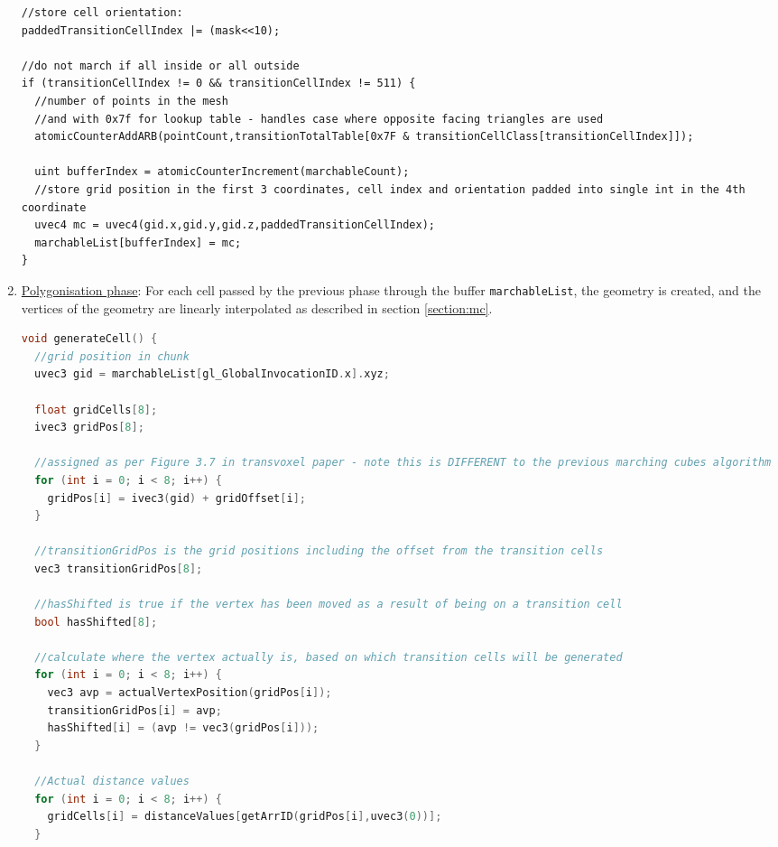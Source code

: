 \documentclass[11pt]{article}
\begin{document}
\begin{enumerate}
\begin{lstlisting}
//store cell orientation:
paddedTransitionCellIndex |= (mask<<10);

//do not march if all inside or all outside
if (transitionCellIndex != 0 && transitionCellIndex != 511) {
  //number of points in the mesh
  //and with 0x7f for lookup table - handles case where opposite facing triangles are used
  atomicCounterAddARB(pointCount,transitionTotalTable[0x7F & transitionCellClass[transitionCellIndex]]);

  uint bufferIndex = atomicCounterIncrement(marchableCount);
  //store grid position in the first 3 coordinates, cell index and orientation padded into single int in the 4th coordinate
  uvec4 mc = uvec4(gid.x,gid.y,gid.z,paddedTransitionCellIndex);
  marchableList[bufferIndex] = mc;
}
\end{lstlisting}

\item \underline{Polygonisation phase}: For each cell passed by the previous phase through the buffer \texttt{marchableList}, the geometry is created, and the vertices of the geometry are linearly interpolated as described in section \ref{section:mc}. 

\begin{lstlisting}[language=C++,label={tv_poly_regular},caption={Code for generating the geometry in a regular cell.}]
void generateCell() {
  //grid position in chunk
  uvec3 gid = marchableList[gl_GlobalInvocationID.x].xyz;

  float gridCells[8];
  ivec3 gridPos[8];

  //assigned as per Figure 3.7 in transvoxel paper - note this is DIFFERENT to the previous marching cubes algorithm
  for (int i = 0; i < 8; i++) {
    gridPos[i] = ivec3(gid) + gridOffset[i];
  }

  //transitionGridPos is the grid positions including the offset from the transition cells
  vec3 transitionGridPos[8];

  //hasShifted is true if the vertex has been moved as a result of being on a transition cell
  bool hasShifted[8];

  //calculate where the vertex actually is, based on which transition cells will be generated
  for (int i = 0; i < 8; i++) {
    vec3 avp = actualVertexPosition(gridPos[i]);
    transitionGridPos[i] = avp;
    hasShifted[i] = (avp != vec3(gridPos[i]));
  }

  //Actual distance values
  for (int i = 0; i < 8; i++) {
    gridCells[i] = distanceValues[getArrID(gridPos[i],uvec3(0))];
  }


\end{lstlisting}
\end{enumerate}
\end{document}
